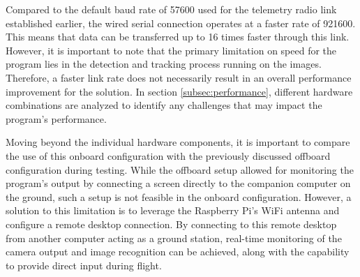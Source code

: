 
Compared to the default baud rate of 57600 used for the telemetry radio link established earlier, the wired serial connection operates at a faster rate of 921600. This means that data can be transferred up to 16 times faster through this link. However, it is important to note that the primary limitation on speed for the program lies in the detection and tracking process running on the images. Therefore, a faster link rate does not necessarily result in an overall performance improvement for the solution. In section  \ref{subsec:performance}, different hardware combinations are analyzed to identify any challenges that may impact the program's performance.

Moving beyond the individual hardware components, it is important to compare the use of this onboard configuration with the previously discussed offboard configuration during testing. While the offboard setup allowed for monitoring the program's output by connecting a screen directly to the companion computer on the ground, such a setup is not feasible in the onboard configuration. However, a solution to this limitation is to leverage the Raspberry Pi's WiFi antenna and configure a remote desktop connection. By connecting to this remote desktop from another computer acting as a ground station, real-time monitoring of the camera output and image recognition can be achieved, along with the capability to provide direct input during flight.